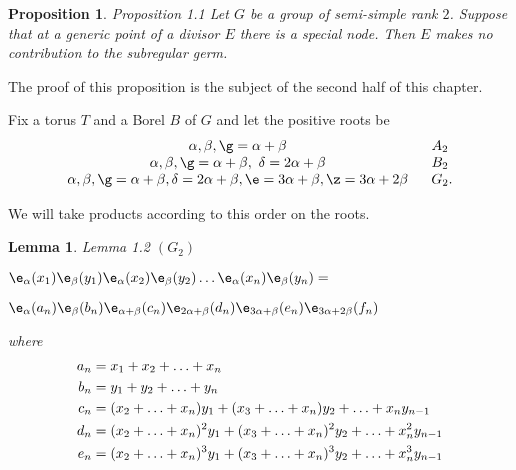 \documentclass{memo-l}
\newtheorem{lemma}[theorem]{Lemma}
\newtheorem{proposition}[theorem]{Proposition}
\theoremstyle{definition}
\theoremstyle{remark}
\numberwithin{section}{chapter}
\numberwithin{equation}{chapter}
\begin{document}
\begin{proposition}{Proposition 1.1}   Let $G$ be a group of semi-simple rank $2$.
 Suppose that at a generic point of a divisor $E$ there is a special node.
 Then $E$ makes no contribution to the subregular germ.
 \end{proposition}

   The proof of this proposition is the subject of the second half of
this chapter.

   Fix a torus $T$ and a Borel $B$ of $G$ and let the positive roots be
$$
\begin{matrix}
{\alpha}, {\beta}, {\g} = {\alpha}+{\beta}  &\ \  A_{2}\phantom{.} \\
{\alpha}, {\beta}, {\g} = {\alpha}+{\beta},\ {\delta} = 2{\alpha}+{\beta}
&\ \  B_{2}\phantom{.} \\
{\alpha}, {\beta}, {\g} = {\alpha}+{\beta}, {\delta} = 2{\alpha}+{\beta},
{\e} = 3{\alpha}+{\beta}, {\z} = 3{\alpha}+2{\beta} &\ \ G_{2}.
\end{matrix}
$$

We will take products according to this order on the roots.

\medskip

\begin{lemma}{Lemma 1.2}   $(G_{2})$

${\e}_{\alpha}(x_{1}){\e}_{\beta}(y_{1}){\e}_{\alpha}
(x_{2}){\e}_{\beta}(y_{2})\ldots
{\e}_{\alpha}(x_{n}){\e}_{\beta}(y_{n}) = $

${\e}_{\alpha}(a_{n}){\e}_{\beta}(b_{n}){\e}_{{\alpha} +
{\beta}}(c_{n}){\e}_{2{\alpha}+{\beta}}(d_{n}){\e}_{3{\alpha} +
{\beta}}(e_{n}){\e}_{3{\alpha}+2{\beta}}(f_{n})$

\noindent
where
$$
\aligned
a_{n} &= x_{1} + x_{2} +\ldots + x_{n} \\
b_{n} &= y_{1} + y_{2} +\ldots + y_{n} \\
c_{n} &= (x_{2}+\ldots +x_{n})y_{1} + (x_{3}+\ldots +x_{n})y_{2} + \ldots +
x_{n}y_{n-1}\\
d_{n} &= (x_{2}+\ldots +x_{n})^{2}y_{1} + (x_{3}+\ldots +x_{n})^{2}y_{2} +
\ldots + x_{n}^{2}y_{n-1}\\
e_{n} &= (x_{2}+\ldots +x_{n})^{3}y_{1} + (x_{3}+\ldots +x_{n})^{3}y_{2} +
\ldots + x_{n}^{3}y_{n-1}
\endaligned
$$
\end{lemma}
\end{document}
